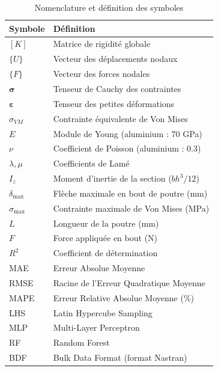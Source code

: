 \documentclass[journal, a4paper, twocolumn]{IEEEtran}
\begin{document}
\begin{table}[H]
\centering
\caption{Nomenclature et définition des symboles}
\begin{tabular}{@{}ll@{}}
\toprule
\textbf{Symbole} & \textbf{Définition} \\
\midrule
$[K]$ & Matrice de rigidité globale \\
$\{U\}$ & Vecteur des déplacements nodaux \\
$\{F\}$ & Vecteur des forces nodales \\
$\bm{\sigma}$ & Tenseur de Cauchy des contraintes \\
$\bm{\varepsilon}$ & Tenseur des petites déformations \\
$\sigma_{VM}$ & Contrainte équivalente de Von Mises \\
$E$ & Module de Young (aluminium : 70 GPa) \\
$\nu$ & Coefficient de Poisson (aluminium : 0.3) \\
$\lambda, \mu$ & Coefficients de Lamé \\
$I_z$ & Moment d'inertie de la section ($bh^3/12$) \\
$\delta_{\max}$ & Flèche maximale en bout de poutre (mm) \\
$\sigma_{\max}$ & Contrainte maximale de Von Mises (MPa) \\
$L$ & Longueur de la poutre (mm) \\
$F$ & Force appliquée en bout (N) \\
$R^2$ & Coefficient de détermination \\
MAE & Erreur Absolue Moyenne \\
RMSE & Racine de l'Erreur Quadratique Moyenne \\
MAPE & Erreur Relative Absolue Moyenne (\%) \\
LHS & Latin Hypercube Sampling \\
MLP & Multi-Layer Perceptron \\
RF & Random Forest \\
BDF & Bulk Data Format (format Nastran) \\
\bottomrule
\end{tabular}
\end{table}
\end{document}
